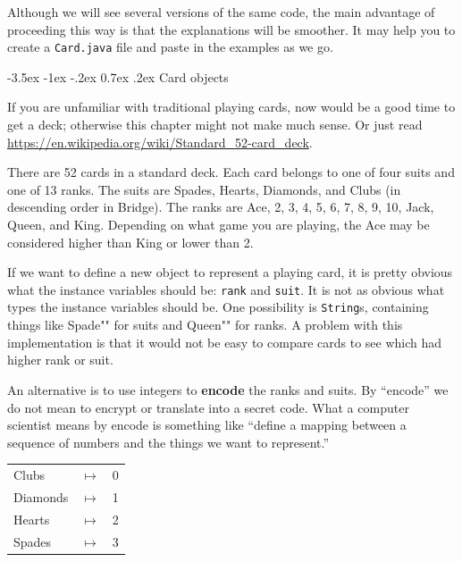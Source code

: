 \documentclass[12pt]{book}
\makeatletter
\theoremstyle{exercise}
\newcommand{\java}[1]{\verb"#1"}
\renewcommand{\section}{\@startsection {section}{1}{\z@}%
    {-3.5ex \@plus -1ex \@minus -.2ex}%
    {0.7ex \@plus.2ex}%
    {\normalfont\Large\bfseries}}
\newcommand{\java}[1]{\lstinline{#1}} %
\makeatother
\begin{document}
Although we will see several versions of the same code, the main advantage of proceeding this way is that the explanations will be smoother.
It may help you to create a {\tt Card.java} file and paste in the examples as we go.



\section{Card objects}
\label{card}


If you are unfamiliar with traditional playing cards, now would be a good time to get a deck; otherwise this chapter might not make much sense.
Or just read \url{https://en.wikipedia.org/wiki/Standard_52-card_deck}.


There are 52 cards in a standard deck.
Each card belongs to one of four suits and one of 13 ranks.
The suits are Spades, Hearts, Diamonds, and Clubs (in descending order in Bridge).
The ranks are Ace, 2, 3, 4, 5, 6, 7, 8, 9, 10, Jack, Queen, and King.
Depending on what game you are playing, the Ace may be considered higher than King or lower than 2.

If we want to define a new object to represent a playing card, it is pretty obvious what the instance variables should be: \java{rank} and \java{suit}.
It is not as obvious what types the instance variables should be.
One possibility is \java{String}s, containing things like \java{"Spade"} for suits and \java{"Queen"} for ranks.
A problem with this implementation is that it would not be easy to compare cards to see which had higher rank or suit.


An alternative is to use integers to {\bf encode} the ranks and suits.
By ``encode'' we do not mean to encrypt or translate into a secret code.
What a computer scientist means by encode is something like ``define a mapping between a sequence of numbers and the things we want to represent.''

\begin{tabular}{l c l}
Clubs & $\mapsto$ & 0 \\
Diamonds & $\mapsto$ & 1 \\
Hearts & $\mapsto$ & 2 \\
Spades & $\mapsto$ & 3
\end{tabular}
\end{document}
